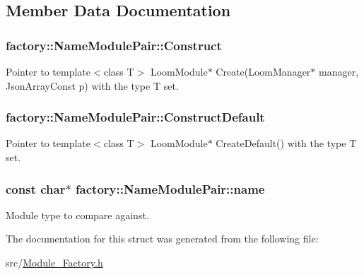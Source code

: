 \subsection{Member Data Documentation}
\subsubsection[{\texorpdfstring{Construct}{Construct}}]{ factory\+::\+Name\+Module\+Pair\+::\+Construct}\hypertarget{structfactory_1_1_name_module_pair_ada6abb90038e59d80f8b0bbfa2b0f39b}{}\label{structfactory_1_1_name_module_pair_ada6abb90038e59d80f8b0bbfa2b0f39b}


Pointer to \textquotesingle{}template$<$class T$>$ Loom\+Module$\ast$ Create(\+Loom\+Manager$\ast$ manager, Json\+Array\+Const p)\textquotesingle{} with the type T set. 

\subsubsection[{\texorpdfstring{Construct\+Default}{ConstructDefault}}]{ factory\+::\+Name\+Module\+Pair\+::\+Construct\+Default}\hypertarget{structfactory_1_1_name_module_pair_ad0df41ece733325bc0b1ba75f7e38e07}{}\label{structfactory_1_1_name_module_pair_ad0df41ece733325bc0b1ba75f7e38e07}


Pointer to \textquotesingle{}template$<$class T$>$ Loom\+Module$\ast$ Create\+Default()\textquotesingle{} with the type T set. 

\subsubsection[{\texorpdfstring{name}{name}}]{\setlength{\rightskip}{0pt plus 5cm}const char$\ast$ factory\+::\+Name\+Module\+Pair\+::name}\hypertarget{structfactory_1_1_name_module_pair_abd0feebc88465d1acbd71eb3ed632fe2}{}\label{structfactory_1_1_name_module_pair_abd0feebc88465d1acbd71eb3ed632fe2}


Module type to compare against. 



The documentation for this struct was generated from the following file\+:\begin{DoxyCompactItemize}
\item 
src/\hyperlink{_module___factory_8h}{Module\+\_\+\+Factory.\+h}\end{DoxyCompactItemize}
